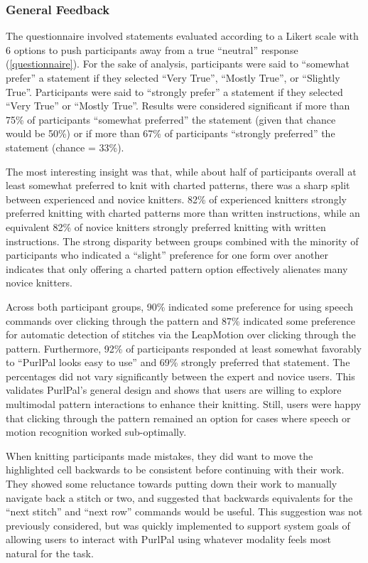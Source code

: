 \documentclass[11pt,twocolumn]{article}
\begin{document}
\subsubsection{General Feedback} \label{feedback}

The questionnaire involved statements evaluated according to a Likert scale with 6 options to push participants away from a true ``neutral'' response (\ref{questionnaire}).
For the sake of analysis, participants were said to ``somewhat prefer'' a statement if they selected ``Very True'', ``Mostly True'', or ``Slightly True''.
Participants were said to ``strongly prefer'' a statement if they selected ``Very True'' or ``Mostly True''.
Results were considered significant if more than 75\% of participants ``somewhat preferred'' the statement (given that chance would be 50\%) or if more than 67\% of participants ``strongly preferred'' the statement (chance = 33\%).

The most interesting insight was that, while about half of participants overall at least somewhat preferred to knit with charted patterns, there was a sharp split between experienced and novice knitters.
82\% of experienced knitters strongly preferred knitting with charted patterns more than written instructions, while an equivalent 82\% of novice knitters strongly preferred knitting with written instructions.
The strong disparity between groups combined with the minority of participants who indicated a ``slight'' preference for one form over another indicates that only offering a charted pattern option effectively alienates many novice knitters.

Across both participant groups, 90\% indicated some preference for using speech commands over clicking through the pattern and 87\% indicated some preference for automatic detection of stitches via the LeapMotion over clicking through the pattern.
Furthermore, 92\% of participants responded at least somewhat favorably to ``PurlPal looks easy to use'' and 69\% strongly preferred that statement.
The percentages did not vary significantly between the expert and novice users.
This validates PurlPal's general design and shows that users are willing to explore multimodal pattern interactions to enhance their knitting.
Still, users were happy that clicking through the pattern remained an option for cases where speech or motion recognition worked sub-optimally.

When knitting participants made mistakes, they did want to move the highlighted cell backwards to be consistent before continuing with their work.
They showed some reluctance towards putting down their work to manually navigate back a stitch or two, and suggested that backwards equivalents for the ``next stitch'' and ``next row'' commands would be useful.
This suggestion was not previously considered, but was quickly implemented to support system goals of allowing users to interact with PurlPal using whatever modality feels most natural for the task.
\end{document}
